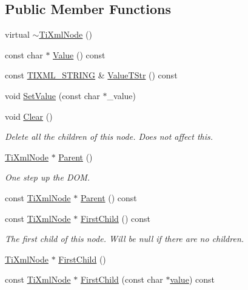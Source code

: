 \subsection*{Public Member Functions}
\begin{DoxyCompactItemize}
\item 
virtual \hyperlink{class_ti_xml_node_a027a76cccd359c831ee4024b58c49625}{$\sim$\+Ti\+Xml\+Node} ()
\item 
const char $\ast$ \hyperlink{class_ti_xml_node_ad44dfe927d49a74dd78b72b7514417ad}{Value} () const
\item 
const \hyperlink{tinyxml_8h_a92bada05fd84d9a0c9a5bbe53de26887}{T\+I\+X\+M\+L\+\_\+\+S\+T\+R\+I\+NG} \& \hyperlink{class_ti_xml_node_a74c4ea4a91c0a91900c919f69f657d6a}{Value\+T\+Str} () const
\item 
void \hyperlink{class_ti_xml_node_a2a38329ca5d3f28f98ce932b8299ae90}{Set\+Value} (const char $\ast$\+\_\+value)
\item 
void \hyperlink{class_ti_xml_node_a708e7f953df61d4d2d12f73171550a4b}{Clear} ()
\begin{DoxyCompactList}\small\item\em Delete all the children of this node. Does not affect \textquotesingle{}this\textquotesingle{}. \end{DoxyCompactList}\item 
\hyperlink{class_ti_xml_node}{Ti\+Xml\+Node} $\ast$ \hyperlink{class_ti_xml_node_ab643043132ffd794f8602685d34a982e}{Parent} ()
\begin{DoxyCompactList}\small\item\em One step up the D\+OM. \end{DoxyCompactList}\item 
const \hyperlink{class_ti_xml_node}{Ti\+Xml\+Node} $\ast$ \hyperlink{class_ti_xml_node_af13df38878a5798142693d01d6133ba0}{Parent} () const
\item 
const \hyperlink{class_ti_xml_node}{Ti\+Xml\+Node} $\ast$ \hyperlink{class_ti_xml_node_aa66bceae19707c90c1db12d7c98894a4}{First\+Child} () const
\begin{DoxyCompactList}\small\item\em The first child of this node. Will be null if there are no children. \end{DoxyCompactList}\item 
\hyperlink{class_ti_xml_node}{Ti\+Xml\+Node} $\ast$ \hyperlink{class_ti_xml_node_a5e97d69b7c0ebd27fb7286be56559b77}{First\+Child} ()
\item 
const \hyperlink{class_ti_xml_node}{Ti\+Xml\+Node} $\ast$ \hyperlink{class_ti_xml_node_ae98c367f664890c4b5a5183481ec128a}{First\+Child} (const char $\ast$\hyperlink{class_ti_xml_node_aead528b3cedc33c16a6c539872c7cc8b}{value}) const

\end{DoxyCompactItemize}
